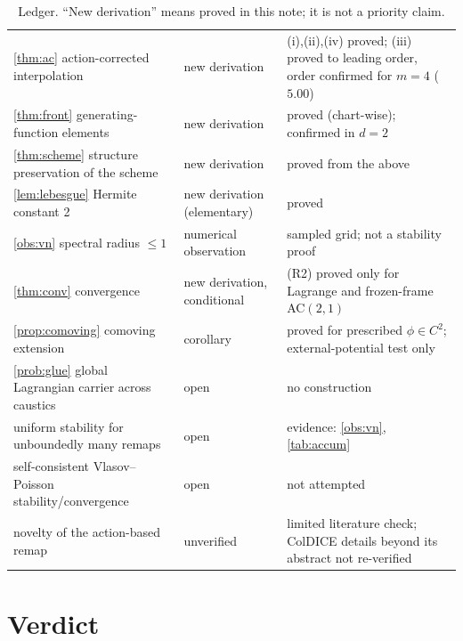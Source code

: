 \begin{table}[h]
\begin{tabular}{p{4.4cm}p{2.6cm}p{7.9cm}}
\cref{thm:ac} action-corrected interpolation & new derivation & (i),(ii),(iv) proved; (iii) proved to leading order, order confirmed for $m=4$ ($5.00$)\\
\cref{thm:front} generating-function elements & new derivation & proved (chart-wise); confirmed in $d=2$\\
\cref{thm:scheme} structure preservation of the scheme & new derivation & proved from the above\\
\cref{lem:lebesgue} Hermite constant 2 & new derivation (elementary) & proved\\
\cref{obs:vn} spectral radius $\le1$ & numerical observation & sampled grid; not a stability proof\\
\cref{thm:conv} convergence & new derivation, conditional & (R2) proved only for Lagrange and frozen-frame AC$(2,1)$\\
\cref{prop:comoving} comoving extension & corollary & proved for prescribed $\phi\in C^2$; external-potential test only\\
\cref{prob:glue} global Lagrangian carrier across caustics & open & no construction\\
uniform stability for unboundedly many remaps & open & evidence: \cref{obs:vn}, \cref{tab:accum}\\
self-consistent Vlasov--Poisson stability/convergence & open & not attempted\\
novelty of the action-based remap & unverified & limited literature check; ColDICE details beyond its abstract not re-verified\\\bottomrule
\end{tabular}
\caption{Ledger. ``New derivation'' means proved in this note; it is not a priority claim.}\label{tab:ledger}
\end{table}

\section{Verdict}\label{sec:verdict}

